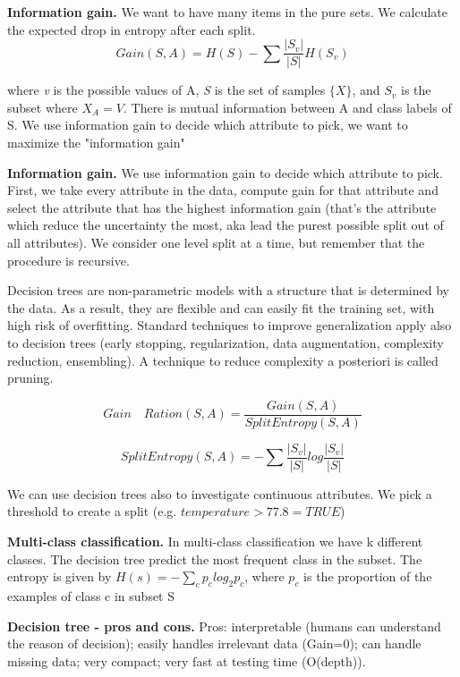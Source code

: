 \documentclass{article}
\begin{document}
\bigskip

\textbf{Information gain. } We want to have many items in the pure sets. We calculate the expected drop in entropy after each split.
\[Gain(S, A) = H(S) - \sum \dfrac{|S_v|}{|S|}H(S_v)\]

where \emph{v} is the possible values of A, \emph{S} is the set of samples \(\{X\}\), and \(S_v\) is the subset where \(X_A = V\). There is mutual information between A and class labels of S. 
We use information gain to decide which attribute to pick, we want to maximize the "information gain"
\bigskip

\textbf{Information gain.  }We use information gain to decide which attribute to pick. First, we take every attribute in the data, compute gain for that attribute and select the attribute that has the highest information gain (that's the attribute which reduce the uncertainty the most, aka lead the purest possible split out of all attributes). 
We consider one level split at a time, but remember that the procedure is recursive.
\bigskip



Decision trees are non-parametric models with a structure that is determined by the data. As a result, they are flexible and can easily fit the training set, with high risk of overfitting. Standard techniques to improve generalization apply also to decision trees (early stopping, regularization, data augmentation, complexity reduction, ensembling). A technique to reduce complexity a posteriori is called pruning.

\[Gain\quad Ration (S,A) = \dfrac{Gain(S,A)}{SplitEntropy(S, A)}\]

\[SplitEntropy(S,A) = - \sum \dfrac{|S_v|}{|S|} log \dfrac{|S_v|}{|S|}\]

\bigskip

We can use decision trees also to investigate continuous attributes. We pick a threshold to create a split (e.g. \(temperature > 77.8 = TRUE\))

\bigskip


\textbf{Multi-class classification.} In multi-class classification we have k different classes. The decision tree predict the most frequent class in the subset. The entropy is given by \(H(s) = - \sum_cp_clog_2p_c\), where \(p_c\) is the proportion of the examples of class c in subset S
\bigskip

\textbf{Decision tree - pros and cons. } Pros: interpretable (humans can understand the reason of decision); easily handles irrelevant data (Gain=0); can handle missing data; very compact; very fast at testing time (O(depth)). 
\end{document}
